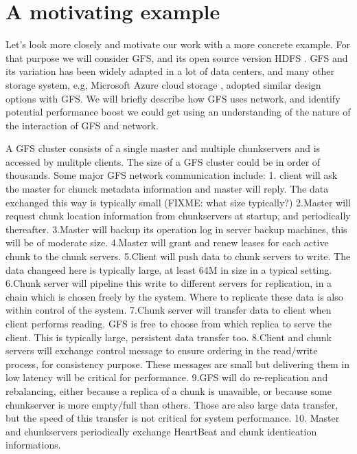 \section{A motivating example}
\label{section:motivation}

Let's look more closely and motivate our work with a more concrete example. For that purpose we will consider GFS, and its open source version HDFS \cite{hdfs}. GFS and its variation has been widely adapted in a lot of data centers, and many other storage system, e.g, Microsoft Azure cloud storage \cite{azure-storage}, adopted similar design options with GFS. We will briefly describe how GFS uses network, and identify potential performance boost we could get using an understanding of the nature of the interaction of GFS and network.

A GFS cluster consists of a single master and multiple chunkservers and is accessed by mulitple clients. The size of a GFS cluster could be in order of thousands. Some major GFS network communication include:
1. client will ask the master for chunck metadata information and master will reply. The data exchanged this way is typically small (FIXME: what size typically?)
2.Master will request chunk location information from chunkservers at startup, and periodically thereafter.
3.Master will backup its operation log in server backup machines, this will be of moderate size.
4.Master will grant and renew leases for each active chunk to the chunk servers.
5.Client will push data to chunk servers to write. The data changeed here is typically large, at least 64M in size in a typical setting.
6.Chunk server will pipeline this write to different servers for replication, in a chain which is chosen freely by the system. Where to replicate these data is also within control of the system.
7.Chunk server will transfer data to client when client performs reading. GFS is free to choose from which replica to serve the client. This is typically large, persistent data transfer too.
8.Client and chunk servers will exchange control message to ensure ordering in the read/write process, for consistency purpose. These messages are small but delivering them in low latency will be critical for performance.
9.GFS will do re-replication and rebalancing, either because a replica of a chunk is unavaible, or because some chunkserver is more empty/full than others. Those are also large data transfer, but the speed of this transfer is not critical for system performance.
10. Master and chunkservers periodically exchange HeartBeat and chunk identication informations.

